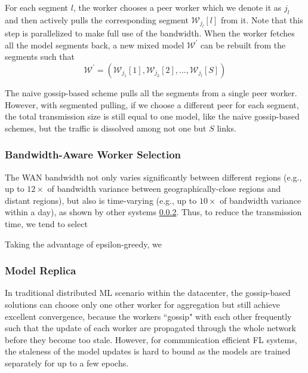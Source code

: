 For each segment $l$, the worker chooses a peer worker which we denote it as $j_l$ and then actively pulls the corresponding segment $\mathcal{W}_{j_l}[l]$ from it. Note that this step is parallelized to make full use of the bandwidth. When the worker fetches all the model segments back, a new mixed model $\mathcal{W}^\prime$ can be rebuilt from the segments such that
\begin{equation}
    \mathcal{W}^\prime = (\mathcal{W}_{j_1}[1],\mathcal{W}_{j_2}[2],\dots,\mathcal{W}_{j_l}[S])
\end{equation}

The naive gossip-based scheme pulls all the segments from a single peer worker. However, with segmented pulling, if we choose a different peer for each segment, the total transmission size is still equal to one model, like the naive gossip-based schemes, but the traffic is dissolved among not one but $S$ links.


\subsubsection{Bandwidth-Aware Worker Selection}
The WAN bandwidth not only varies significantly between different regions (e.g., up to $12 \times$ of bandwidth variance between geographically-close regions and distant regions), but also is time-varying (e.g., up to $10 \times$ of bandwidth variance within a day), as shown by other systems \ref{}.  Thus, to reduce the transmission time, we tend to select 

Taking the advantage of epsilon-greedy, we 




\subsubsection{Model Replica}

% 

In traditional distributed ML scenario within the datacenter, the gossip-based solutions can choose only one other worker for aggregation but still achieve excellent convergence, because the workers ``gossip" with each other frequently such that the update of each worker are propagated through the whole network before they become too stale\cite{daily2018gossipgrad:}. However, for communication efficient FL systems, the staleness of the model updates is hard to bound as the models are trained separately for up to a few epochs. 
 

